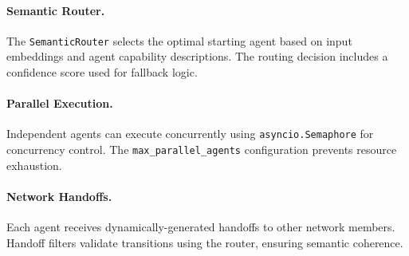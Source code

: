 \paragraph{Semantic Router.} The \texttt{SemanticRouter} selects the optimal starting agent based on input embeddings and agent capability descriptions. The routing decision includes a confidence score used for fallback logic.

\paragraph{Parallel Execution.} Independent agents can execute concurrently using \texttt{asyncio.Semaphore} for concurrency control. The \texttt{max\_parallel\_agents} configuration prevents resource exhaustion.

\paragraph{Network Handoffs.} Each agent receives dynamically-generated handoffs to other network members. Handoff filters validate transitions using the router, ensuring semantic coherence.


